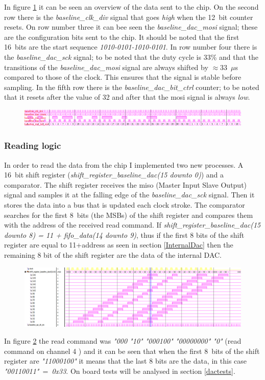 \noindent In figure \ref{fig:fsmalmostall} it can be seen an overview of the data sent to the chip. On the second row there is the \textit{baseline\_clk\_div} signal that goes \textit{high} when the 12~bit counter resets. On row number three it can bee seen the \textit{baseline\_dac\_mosi} signal; these are the configuration bits sent to the chip. It should be noted that the first 16~bits are the start sequence \textit{1010-0101-1010-0101}. In row number four there is the \textit{baseline\_dac\_sck} signal; to be noted that the duty cycle is 33\% and that the transitions of the \textit{baseline\_dac\_mosi} signal are always shifted by $\approx$33~$\mu$s compared to those of the clock.
This ensures that the signal is stable before sampling.
In the fifth row there is the \textit{baseline\_dac\_bit\_ctrl} counter; to be noted that it resets after the value of 32 and after that the mosi signal is always \textit{low}.   
\begin{figure}[H]
	\centering
	\includegraphics[width=1.0\linewidth]{IMG/ch4/DACsimulations/FSMalmostall}
	\caption{}
	\label{fig:fsmalmostall}
\end{figure}
\subsubsection{Reading logic}
In order to read the data from the chip I implemented two new processes. A 16~bit shift register (\textit{shift\_register\_baseline\_dac(15 downto 0)}) and a comparator.
The shift register receives the miso (Master Input Slave Output) signal and samples it at the falling edge of the \textit{baseline\_dac\_sck} signal. Then it stores the data into a bus that is updated each clock stroke.
The comparator searches for the first 8~bits (the MSBs) of the shift register and compares them with the address of the received read command.
If \textit{shift\_register\_baseline\_dac(15 downto 8) = 11 + fifo\_data(14 downto 9)}, thus if the first 8 bits of the shift register are equal to 11+address as seen in section \ref{InternalDac} then the remaining 8 bit of the shift register are the data of the internal DAC.
\begin{figure}[H]
	\centering
	\includegraphics[width=1.0\linewidth]{IMG/ch4/DACsimulations/FSMshiftregister}
	\caption{}
	\label{fig:fsmshiftregister}
\end{figure}
\noindent In figure \ref{fig:fsmshiftregister} the read command was \textit{"000 "10" "000100" "00000000" "0"} (read command on channel 4 ) and it can be seen that when the first 8~bits of the shift register are \textit{"11000100"} it means that the last 8 bits are the data, in this case \textit{"00110011"}~=~\textit{0x33}.
On board tests will be analysed  in section \ref{dactests}.

